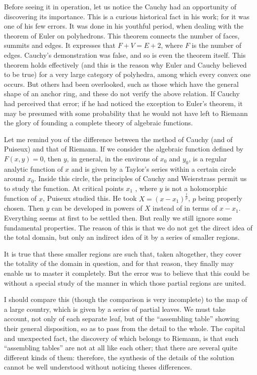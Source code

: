 \documentclass[12pt,oneside]{book}
\begin{document}
Before seeing it in operation, let us notice the Cauchy had an opportunity of
discovering its importance. This is a curious historical fact in his work; for
it was one of his few errors. It was done in his youthful period, when dealing
with the theorem of Euler on polyhedrons. This theorem connects the number of
faces, summits and edges. It expresses that $F+V=E+2$, where $F$ is the number
of edges. Cauchy's demonstration was false, and so is even the theorem itself.
This theorem holds effectively (and this is the reason why Euler and Cauchy
believed to be true) for a very large category of polyhedra, among which every
convex one occurs. But others had been overlooked, such as those which have the
general shape of an anchor ring, and these do not verify the above relation. If
Cauchy had perceived that error; if he had noticed the exception to Euler's
theorem, it may be presumed with some probability that he would not have left to
Riemann the glory of founding a complete theory of algebraic functions. \par

Let me remind you of the difference between the method of Cauchy (and of
Puiseux) and that of Riemann. If we consider the algebraic function defined by
$F(x,y)=0$, then $y$, in general, in the environs of $x_0$ and $y_0$, is a
regular analytic function of $x$ and is given by a Taylor's series within a
certain circle around $x_0$. Inside this circle, the principles of Cauchy and
Weierstrass permit us to study the function. At critical points $x_1$ , where
$y$ is not a holomorphic function of $x$, Puiseux studied this. He took
$X=(x-x_1)^\frac{1}{p}$, $p$ being properly chosen. Then $y$ can be developed in
powers of $X$ instead of in terms of $x-x_1$. Everything seems at first to be
settled then. But really we still ignore some fundamental properties. The reason
of this is that we do not get the direct idea of the total domain, but only an
indirect idea of it by a series of smaller regions. \par

It is true that these smaller regions are such that, taken altogether, they cover
the totality of the domain in question, and for that reason, they finally may
enable us to master it completely. But the error was to believe that this could
be without a special study of the manner in which those partial regions are
united. \par

I should compare this (though the comparison is very incomplete) to the map of a
large country, which is given by a series of partial leaves. We must take
account, not only of each separate leaf, but of the ``assembling table'' showing
their general disposition, so as to pass from the detail to the whole. The
capital and unexpected fact, the discovery of which belongs to Riemann, is that
such ``assembling tables'' are not at all like each other; that there are
several quite different kinds of them: therefore, the synthesis of the details
of the solution cannot be well understood without noticing theses differences.
\par
\end{document}
